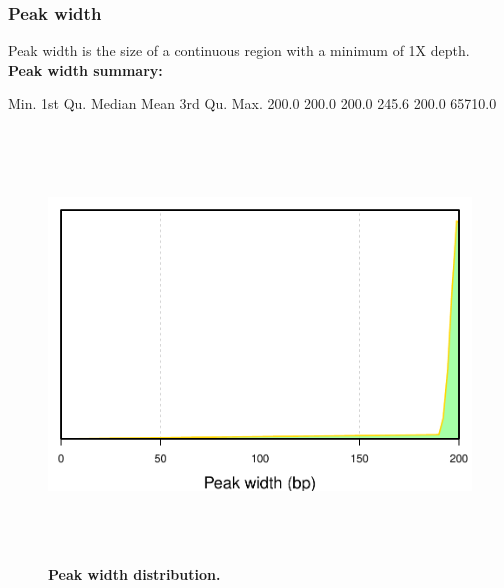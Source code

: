 \documentclass{article}
\begin{document}
\subsubsection{Peak width}
Peak width is the size of a continuous region with a minimum of 1X depth.
\vspace*{1\baselineskip}
\\{\textbf{Peak width summary:}}
\begin{Schunk}
\begin{Soutput}
   Min. 1st Qu.  Median    Mean 3rd Qu.    Max. 
  200.0   200.0   200.0   245.6   200.0 65710.0 
\end{Soutput}
\end{Schunk}


\begin{center}
\begin{figure}[H]
\includegraphics[width=6.5in, height=4.5in, page=1]{bamchop-chip-peak-width}
\caption{\textbf{Peak width distribution.}\small{}}
\end{figure}
\end{center}
\end{document}
